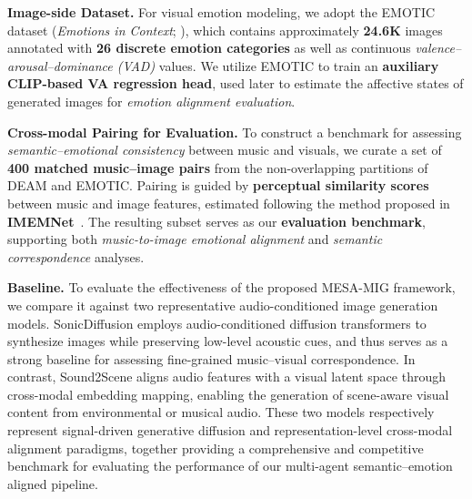 \documentclass[letterpaper]{article}
\begin{document}
\textbf{Image-side Dataset.}  
For visual emotion modeling, we adopt the EMOTIC dataset (\textit{Emotions in Context}; \cite{kosti2017emotic}), which contains approximately \textbf{24.6K} images annotated with \textbf{26 discrete emotion categories} as well as continuous \textit{valence–arousal–dominance (VAD)} values.  
We utilize EMOTIC to train an \textbf{auxiliary CLIP-based VA regression head}, used later to estimate the affective states of generated images for \textit{emotion alignment evaluation}.

\textbf{Cross-modal Pairing for Evaluation.}  
To construct a benchmark for assessing \textit{semantic–emotional consistency} between music and visuals, we curate a set of \textbf{400 matched music–image pairs} from the non-overlapping partitions of DEAM and EMOTIC.
Pairing is guided by \textbf{perceptual similarity scores} between music and image features, estimated following the method proposed in \textbf{IMEMNet}~\cite{zhao2020emotion}.  
The resulting subset serves as our \textbf{evaluation benchmark}, supporting both \textit{music-to-image emotional alignment} and \textit{semantic correspondence} analyses.

\textbf{Baseline.}
To evaluate the effectiveness of the proposed MESA-MIG framework, we compare it against two representative audio-conditioned image generation models. SonicDiffusion\cite{biner2024sonicdiffusion} employs audio-conditioned diffusion transformers to synthesize images while preserving low-level acoustic cues, and thus serves as a strong baseline for assessing fine-grained music–visual correspondence. In contrast, Sound2Scene\cite{kim2023sound2scene} aligns audio features with a visual latent space through cross-modal embedding mapping, enabling the generation of scene-aware visual content from environmental or musical audio. These two models respectively represent signal-driven generative diffusion and representation-level cross-modal alignment paradigms, together providing a comprehensive and competitive benchmark for evaluating the performance of our multi-agent semantic–emotion aligned pipeline.
\end{document}

